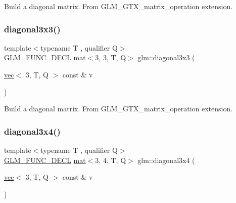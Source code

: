 Build a diagonal matrix. From G\+L\+M\+\_\+\+G\+T\+X\+\_\+matrix\+\_\+operation extension. \mbox{\label{group__gtx__matrix__operation_ga5487ff9cdbc8e04d594adef1bcb16ee0}} 
\subsubsection{\texorpdfstring{diagonal3x3()}{diagonal3x3()}}
{\footnotesize\ttfamily template$<$typename T , qualifier Q$>$ \\
\mbox{\hyperlink{setup_8hpp_ab2d052de21a70539923e9bcbf6e83a51}{G\+L\+M\+\_\+\+F\+U\+N\+C\+\_\+\+D\+E\+CL}} \mbox{\hyperlink{structglm_1_1mat}{mat}}$<$3, 3, T, Q$>$ glm\+::diagonal3x3 (\begin{DoxyParamCaption}\item[{\mbox{\hyperlink{structglm_1_1vec}{vec}}$<$ 3, T, Q $>$ const \&}]{v }\end{DoxyParamCaption})}

Build a diagonal matrix. From G\+L\+M\+\_\+\+G\+T\+X\+\_\+matrix\+\_\+operation extension. \mbox{\label{group__gtx__matrix__operation_gad7551139cff0c4208d27f0ad3437833e}} 
\subsubsection{\texorpdfstring{diagonal3x4()}{diagonal3x4()}}
{\footnotesize\ttfamily template$<$typename T , qualifier Q$>$ \\
\mbox{\hyperlink{setup_8hpp_ab2d052de21a70539923e9bcbf6e83a51}{G\+L\+M\+\_\+\+F\+U\+N\+C\+\_\+\+D\+E\+CL}} \mbox{\hyperlink{structglm_1_1mat}{mat}}$<$3, 4, T, Q$>$ glm\+::diagonal3x4 (\begin{DoxyParamCaption}\item[{\mbox{\hyperlink{structglm_1_1vec}{vec}}$<$ 3, T, Q $>$ const \&}]{v }\end{DoxyParamCaption})}

